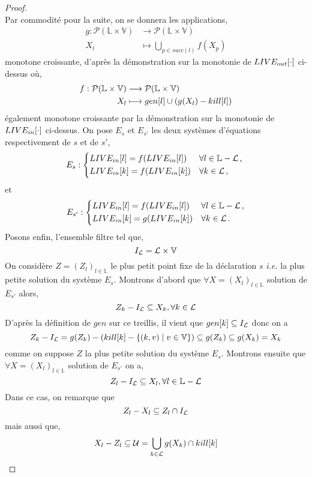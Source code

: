 \documentclass[a4paper, 10pt]{article}
\begin{document}
\begin{proof}
	\\ 
	Par commodité pour la suite, on se donnera les applications,
	\begin{align*}
		g : \mathcal{P}(\mathbb{L} \times \mathbb{V}) &\longrightarrow \mathcal{P}(\mathbb{L} \times \mathbb{V})\\
		X_l &\longmapsto \bigcup\limits_{p\in succ(l)} f(X_p)
	\end{align*}
	monotone croissante, d'après la démonstration sur la monotonie de $LIVE_{out}[\cdot]$ ci-dessus où,
	\begin{align*}
		f : \mathcal{P}(\mathbb{L} \times \mathbb{V}) &\longrightarrow \mathcal{P}(\mathbb{L} \times \mathbb{V})\\
		X_l &\longmapsto gen[l] \cup (g(X_l) - kill[l])
	\end{align*}
	également monotone croissante par la démonstration sur la monotonie de $LIVE_{in}[\cdot]$ ci-dessus.
	On pose $E_s$ et $E_{s'}$ les deux systèmes d'équations respectivement de $s$ et de $s'$,
	\[
	E_s :
	\begin{dcases*}
		\livein{l} = f(\livein{l}) &$\forall l \in \mathbb{L} - \mathcal{L}$\,, \\
		\livein{k} = f(\livein{k}) &$\forall k \in \mathcal{L}$\,,
	\end{dcases*}
	\]
	et
	\[
	E_{s'} :
	\begin{dcases*}
		\livein{l} = f(\livein{l}) &$\forall l \in \mathbb{L} - \mathcal{L}$\,,\\
		\livein{k} = g(\livein{k}) &$\forall k \in \mathcal{L}$\,.
	\end{dcases*}
	\]
	Posons enfin, l'ensemble filtre tel que,
	\[
		I_{\mathcal{L}} = \mathcal{L} \times \mathbb{V}
	\]
	On considère $Z = (Z_l)_{l\in \mathbb{L}}$ le plus petit point fixe de la déclaration $s$ \textit{i.e.} la plus petite solution du système $E_s$.
	Montrons d'abord que $\forall X = (X_l)_{l\in \mathbb{L}}$ solution de $E_{s'}$ alors,
	\[Z_k - I_{\mathcal{L}} \subseteq X_k, \forall k \in \mathcal{L}\]
	D'après la définition de $gen$ sur ce treillis, il vient que $gen[k] \subseteq I_{\mathcal{L}}$ donc on a
	\[Z_k - I_{\mathcal{L}} = g(Z_k) - (kill[k] - \{(k, v) \mid v \in \mathbb{V}\}) \subseteq g(Z_k) \subseteq g(X_k) = X_k\]
	comme on suppose $Z$ la plus petite solution du système $E_s$.
	Montrons ensuite que $\forall X = (X_l)_{l\in \mathbb{L}}$ solution de $E_{s'}$ on a,
	\[
		Z_l - I_{\mathcal{L}} \subseteq X_l, \forall l \in \mathbb{L} - \mathcal{L}
	\]
	Dans ce cas, on remarque que 
	\[Z_l - X_l \subseteq Z_l \cap I_{\mathcal{L}}\] 
	mais aussi que, 
	\[X_l - Z_l \subseteq \mathcal{U} = \bigcup\limits_{k\in \mathcal{L}} g(X_k) \cap kill[k]\]

\end{proof}
\end{document}
